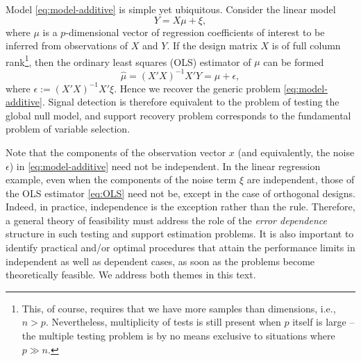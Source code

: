 Model \eqref{eq:model-additive} is simple yet ubiquitous.
Consider the linear model
\begin{equation*}
 Y = X\mu + \xi,
\end{equation*}
where $\mu$ is a $p$-dimensional vector of regression coefficients of interest to be inferred from observations of $X$ and $Y$.
If the design matrix $X$ is of full column rank\footnote{This, of course, requires that we have more samples than dimensions, i.e., $n>p$. Nevertheless, multiplicity of tests is still present when $p$ itself is large -- the multiple testing problem is by no means exclusive to situations where $p\gg n$.}, then the ordinary least squares (OLS) estimator of $\mu$ can be formed 
\begin{equation} \label{eq:OLS}
    \widehat{\mu} = \left(X'X\right)^{-1}X'Y = \mu + \epsilon,
\end{equation}
where $\epsilon := (X'X)^{-1}X'\xi$. 
Hence we recover the generic problem \eqref{eq:model-additive}. 
Signal detection is therefore equivalent to the problem of testing the global null model, and support recovery problem corresponds to the fundamental problem of variable selection.

Note that the components of the observation vector $x$ (and equivalently, the noise $\epsilon$) in \eqref{eq:model-additive} need not be independent. 
In the linear regression example, even when the components of the noise term $\xi$ are independent, those of the OLS estimator \eqref{eq:OLS} need not be, except in the case of orthogonal designs.
Indeed, in practice, independence is the exception rather than the rule.
Therefore, a general theory of feasibility must address the role of the {\em error dependence} structure in such testing and support estimation 
problems.
It is also important to identify practical and/or optimal procedures that attain the performance limits in independent as well as dependent cases, as soon as the problems become theoretically feasible.  We address both themes in this text.


